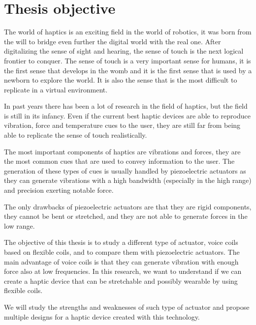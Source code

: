 \section{Thesis objective}

The world of haptics is an exciting field in the world of robotics, it was born from the will to bridge even further the digital world with the real one.
After digitalizing the sense of sight and hearing, the sense of touch is the next logical frontier to conquer.
The sense of touch is a very important sense for humans, it is the first sense that develops in the womb and it is the first sense that is used by a newborn to explore the world.
It is also the sense that is the most difficult to replicate in a virtual environment.

In past years there has been a lot of research in the field of haptics, but the field is still in its infancy.
Even if the current best haptic devices are able to reproduce vibration, force and temperature cues to the user, they are still far from being able to replicate the sense of touch realistically.

The most important components of haptics are vibrations and forces, they are the most common cues that are used to convey information to the user.
The generation of these types of cues is usually handled by piezoelectric actuators as they can generate vibrations with a high bandwidth (especially in the high range) and precision exerting notable force.

The only drawbacks of piezoelectric actuators are that they are rigid components, they cannot be bent or stretched, and they are not able to generate forces in the low range.

The objective of this thesis is to study a different type of actuator, voice coils based on flexible coils, and to compare them with piezoelectric actuators.
The main advantage of voice coils is that they can generate vibration with enough force also at low frequencies. 
In this research, we want to understand if we can create a haptic device that can be stretchable and possibly wearable by using flexible coils.

We will study the strengths and weaknesses of such type of actuator and propose multiple designs for a haptic device created with this technology.